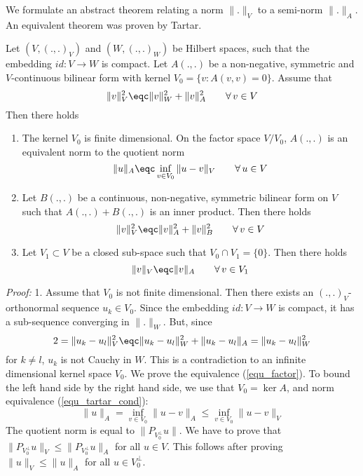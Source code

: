 We formulate an abstract theorem relating a norm $\|.\|_V$ to a semi-norm
$\|.\|_A$. An equivalent theorem was proven by Tartar.
\begin{theorem} [Tartar] \label{theo_tartar}
Let $(V, (.,.)_V)$ and $(W, (.,.)_W)$ be Hilbert spaces, such that
the embedding $id : V \rightarrow W$ is compact.
Let $A(.,.)$ be a non-negative, symmetric and $V$-continuous bilinear form 
with kernel $V_0 = \{ v : A(v,v) = 0 \}$. Assume that
\begin{equation}
\label{equ_tartar_cond}
\| v \|_V^2 \eqc \| v \|_W^2 + \| v \|_A^2 \qquad \forall \, v \in V
\end{equation}
Then there holds
\begin{enumerate}
\item
The kernel $V_0$ is finite dimensional. On the factor space $V/V_0$, 
$A(.,.)$ is an equivalent norm to the quotient norm
\begin{equation} \label{equ_factor}
\| u \|_A \eqc \inf_{v \in V_0} \| u - v \|_V \qquad \forall \, u \in V
\end{equation}
\item
Let $B(.,.)$ be a continuous, non-negative, symmetric bilinear form 
on $V$ such that $A(.,.) + B(.,.)$ is an inner product. Then there
holds
$$
\| v \|_V^2 \eqc \| v \|_A^2 + \| v \|_B^2 \qquad \forall \, v \in V
$$
\item
Let $V_1 \subset V$ be a closed sub-space such that $V_0 \cap V_1 = \{ 0 \}$.
Then there holds
$$
\| v \|_V \eqc \| v \|_A \qquad \forall \, v \in V_1
$$
\end{enumerate}
\end{theorem}
\noindent
{\em Proof:} 1. Assume that $V_0$ is not finite dimensional. Then 
there exists an $(.,.)_V$-orthonormal sequence $u_k \in V_0$. Since
the embedding $id : V \rightarrow W$ is compact, it has a sub-sequence
converging in $\|. \|_W$. But, since
$$
2 = \| u_k - u_l \|_V^2 \eqc \| u_k - u_l \|_W^2 + \| u_k - u_l \|_A
        = \| u_k - u_l \|_W^2
$$ 
for $k \neq l$, $u_k$ is not Cauchy in $W$. This is a contradiction to
an infinite dimensional kernel space $V_0$.
We prove the equivalence (\ref{equ_factor}). To bound the left hand side
by the right hand side, we use that $V_0 = \operatorname {ker} A$, and
norm equivalence (\ref{equ_tartar_cond}):
$$
\| u \|_A = \inf_{v \in V_0} \| u - v \|_A \leq \inf_{v \in V_0} \| u - v \|_V 
$$
The quotient norm is equal to $\| P_{V_0^\bot} u \|$. We have to prove that 
$\| P_{V_0^\bot} u \|_V \leq \| P_{V_0^\bot} u \|_A$ for all $u \in V$.
This follows after proving $\| u \|_V \leq \| u \|_A$ for all $u \in V_0^\bot$.
